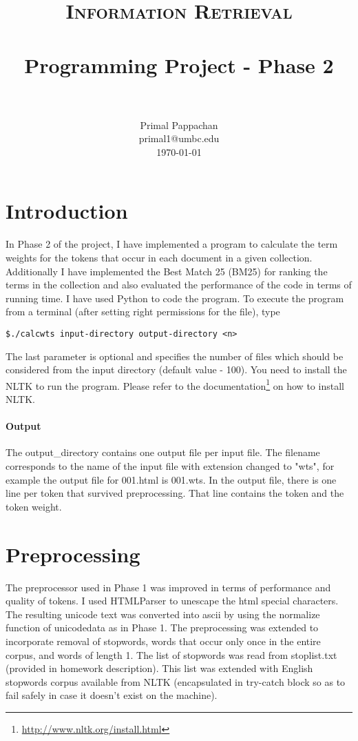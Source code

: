 \documentclass[paper=a4, fontsize=11pt]{scrartcl}
\title{
		\usefont{OT1}{bch}{b}{n}
		\normalfont \normalsize \textsc{Information Retrieval} \\ [25pt]
		\horrule{0.5pt} \\[0.4cm]
		\huge Programming Project - Phase 2 \\
		\horrule{2pt} \\[0.5cm]
}
\author{
		\normalfont 								\normalsize
        Primal Pappachan\\[-3pt]		\normalsize
        primal1@umbc.edu\\[-3pt]		\normalsize
        \today
}
\date{}
\numberwithin{equation}{section}		%
\numberwithin{figure}{section}			%
\numberwithin{table}{section}				%
\begin{document}
\maketitle
\section{Introduction}
In Phase 2 of the project, I have implemented a program to calculate the term weights for the tokens that occur in each document in a given collection. Additionally I have implemented the Best Match 25 (BM25) for ranking the terms in the collection and also evaluated the performance of the code in terms of running time. I have used Python to code the program. To execute the program from a terminal (after setting right permissions for the file), type 

\begin{verbatim}
$./calcwts input-directory output-directory <n>
\end{verbatim}

The last parameter is optional and specifies the number of files which should be considered from the input directory (default value - 100). You need to install the NLTK to run the program. Please refer to the documentation\footnote{\url{http://www.nltk.org/install.html}} on how to install NLTK.

\paragraph{Output}

The output\_directory contains one output file per input file. The filename corresponds to the name of the input file with extension changed to "wts", for example the output file for 001.html is 001.wts. In the output file, there is one line per token that survived preprocessing. That line contains the token and the token weight.

\section{Preprocessing}

The preprocessor used in Phase 1 was improved in terms of performance and quality of tokens. I used HTMLParser to unescape the html special characters. The resulting unicode text was converted into ascii by using the normalize function of unicodedata as in Phase 1. The preprocessing was extended to incorporate removal of stopwords, words that occur only once in the entire corpus, and words of length 1. The list of stopwords was read from stoplist.txt (provided in homework description). This list was extended with English stopwords corpus available from NLTK (encapsulated in try-catch block so as to fail safely in case it doesn't exist on the machine).
\end{document}

